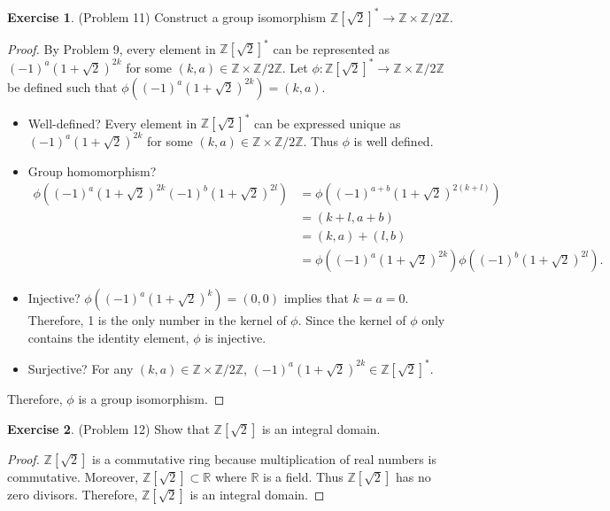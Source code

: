 \documentclass[12pt, psamsfonts]{amsart}
\theoremstyle{definition}
\newtheorem*{exer}{Exercise}
\theoremstyle{remark}
\numberwithin{equation}{section}
\begin{document}
\begin{exer}{(Problem 11)}
  Construct a group isomorphism $\mathbb{Z}[\sqrt{2}]^* \rightarrow \mathbb{Z} \times \mathbb{Z} / 2\mathbb{Z}$.
\end{exer}

\begin{proof}
  By Problem 9, every element in $\mathbb{Z}[\sqrt{2}]^*$ can be represented as $(-1)^a(1 + \sqrt{2})^{2k}$ for some $(k, a) \in \mathbb{Z} \times \mathbb{Z} / 2 \mathbb{Z}$.
  Let $\phi: \mathbb{Z}[\sqrt{2}]^* \rightarrow \mathbb{Z} \times \mathbb{Z} / 2\mathbb{Z}$ be defined such that $\phi((-1)^a(1 + \sqrt{2})^{2k}) = (k, a)$.
  \begin{itemize}
    \item
      Well-defined?
      Every element in $\mathbb{Z}[\sqrt{2}]^*$ can be expressed unique as $(-1)^a(1 + \sqrt{2})^{2k}$ for some $(k, a) \in \mathbb{Z} \times \mathbb{Z} / 2 \mathbb{Z}$.
      Thus $\phi$ is well defined.
    \item
      Group homomorphism?
      \begin{align*}
        \phi((-1)^a(1 + \sqrt{2})^{2k}(-1)^b(1 + \sqrt{2})^{2l})
          &= \phi((-1)^{a + b}(1 + \sqrt{2})^{2(k + l)}) \\
          &= (k + l, a + b) \\
          &= (k, a) + (l, b) \\
          &= \phi((-1)^a(1 + \sqrt{2})^{2k})\phi((-1)^b(1 + \sqrt{2})^{2l}).
      \end{align*}
    \item
      Injective?
      $\phi((-1)^a(1 + \sqrt{2})^k) = (0, 0)$ implies that $k = a = 0$.
      Therefore, 1 is the only number in the kernel of $\phi$.
      Since the kernel of $\phi$ only contains the identity element, $\phi$ is injective.
    \item
      Surjective?
      For any $(k, a) \in \mathbb{Z} \times \mathbb{Z} / 2\mathbb{Z}$, $(-1)^a(1 + \sqrt{2})^{2k} \in \mathbb{Z}[\sqrt{2}]^*$.
  \end{itemize}
  Therefore, $\phi$ is a group isomorphism.
\end{proof}



\begin{exer}{(Problem 12)}
  Show that $\mathbb{Z}[\sqrt{2}]$ is an integral domain.
\end{exer}

\begin{proof}
  $\mathbb{Z}[\sqrt{2}]$ is a commutative ring because multiplication of real numbers is commutative.
  Moreover, $\mathbb{Z}[\sqrt{2}] \subset \mathbb{R}$ where $\mathbb{R}$ is a field.
  Thus $\mathbb{Z}[\sqrt{2}]$ has no zero divisors.
  Therefore, $\mathbb{Z}[\sqrt{2}]$ is an integral domain.
\end{proof}
\end{document}
